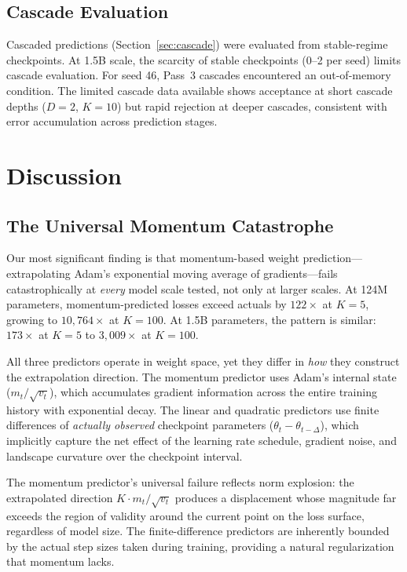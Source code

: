 \documentclass{article}
\begin{document}
\subsection{Cascade Evaluation}

Cascaded predictions (Section~\ref{sec:cascade}) were evaluated from stable-regime checkpoints.
At 1.5B scale, the scarcity of stable checkpoints (0--2 per seed) limits cascade evaluation.
For seed 46, Pass~3 cascades encountered an out-of-memory condition.
The limited cascade data available shows acceptance at short cascade depths ($D{=}2$, $K{=}10$) but rapid rejection at deeper cascades, consistent with error accumulation across prediction stages.

\section{Discussion}
\label{sec:discussion}

\subsection{The Universal Momentum Catastrophe}

Our most significant finding is that momentum-based weight prediction---extrapolating Adam's exponential moving average of gradients---fails catastrophically at \emph{every} model scale tested, not only at larger scales.
At 124M parameters, momentum-predicted losses exceed actuals by $122\times$ at $K{=}5$, growing to $10{,}764\times$ at $K{=}100$.
At 1.5B parameters, the pattern is similar: $173\times$ at $K{=}5$ to $3{,}009\times$ at $K{=}100$.

All three predictors operate in weight space, yet they differ in \emph{how} they construct the extrapolation direction.
The momentum predictor uses Adam's internal state ($m_t / \sqrt{v_t}$), which accumulates gradient information across the entire training history with exponential decay.
The linear and quadratic predictors use finite differences of \emph{actually observed} checkpoint parameters ($\theta_t - \theta_{t-\Delta}$), which implicitly capture the net effect of the learning rate schedule, gradient noise, and landscape curvature over the checkpoint interval.

The momentum predictor's universal failure reflects norm explosion: the extrapolated direction $K \cdot m_t / \sqrt{v_t}$ produces a displacement whose magnitude far exceeds the region of validity around the current point on the loss surface, regardless of model size.
The finite-difference predictors are inherently bounded by the actual step sizes taken during training, providing a natural regularization that momentum lacks.
\end{document}
